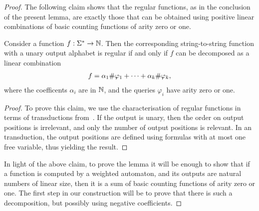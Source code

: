 \begin{proof}
The following claim shows that the regular functions, as in the conclusion of the present lemma, are exactly those that can be obtained using positive linear combinations of basic counting functions of arity zero or one.
    \begin{claim}\label{claim:mso-counting-regular}
        Consider a function $f : \Sigma^* \to {\mathbb N}$. Then the corresponding string-to-string function with a unary output alphabet is regular if and only if $f$  can be decomposed as  a linear combination 
        \begin{align*}
        f = \alpha_1 \#{\varphi_1} + \cdots +  \alpha_k \#{\varphi_k},
        \end{align*}        
        where the coefficents $\alpha_i$ are in ${\mathbb N}$, and the queries $\varphi_i$ have arity zero or one.
    \end{claim}
    \begin{proof}
        To prove this claim, we use the characterisation of regular functions in terms of \mso transductions from~\cite[Section 4]{engelfrietMSODefinableString2001}. If the output is unary, then the order on output positions is irrelevant, and only the number of output positions is relevant. In an \mso transduction, the output positions are defined using \mso formulas with at most one free variable, thus yielding the result. 
    \end{proof}

In light of the above claim, to prove the lemma it will be enough to show that if a function is computed by a weighted automaton, and its  outputs are natural numbers of linear size, then it is a sum of basic counting functions of arity zero or one. The first step in our construction will be to prove that there is such a decomposition, but possibly using negative coefficients.


\end{proof}

